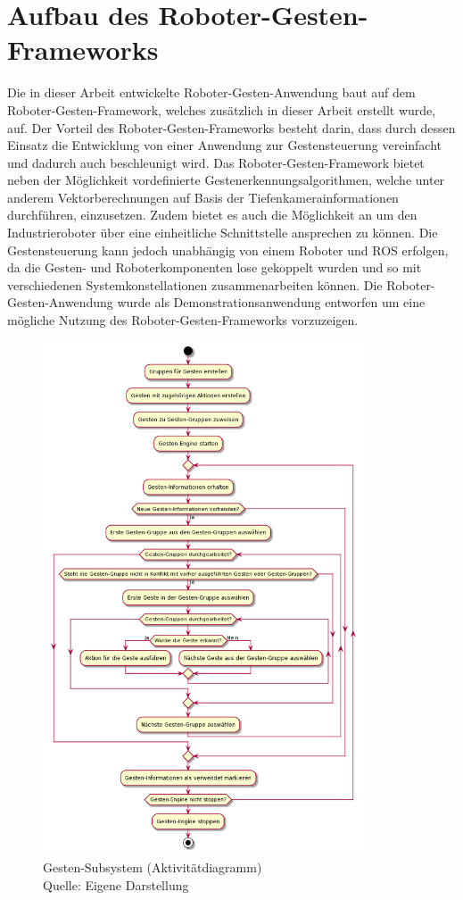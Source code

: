 \section{Aufbau des Roboter-Gesten-Frameworks}
Die in dieser Arbeit entwickelte Roboter-Gesten-Anwendung baut auf dem Roboter-Gesten-Framework, welches zusätzlich in dieser Arbeit erstellt wurde, auf. Der Vorteil des Roboter-Gesten-Frameworks besteht darin, dass durch dessen Einsatz die Entwicklung von einer Anwendung zur Gestensteuerung vereinfacht und dadurch auch beschleunigt wird. Das Roboter-Gesten-Framework bietet neben der Möglichkeit vordefinierte Gestenerkennungsalgorithmen, welche unter anderem Vektorberechnungen auf Basis der Tiefenkamerainformationen durchführen, einzusetzen. Zudem bietet es auch die Möglichkeit an um den Industrieroboter über eine einheitliche Schnittstelle ansprechen zu können. Die Gestensteuerung kann jedoch unabhängig von einem Roboter und ROS erfolgen, da die Gesten- und Roboterkomponenten lose gekoppelt wurden und so mit verschiedenen Systemkonstellationen zusammenarbeiten können. Die Roboter-Gesten-Anwendung wurde als Demonstrationsanwendung entworfen um eine mögliche Nutzung des Roboter-Gesten-Frameworks vorzuzeigen.

\begin{figure}[htb]
	\centering
	\includegraphics[width=0.85\textwidth]{images/loesungsweg/gesture_subsystem_uml}
	\caption[Gesten-Subsystem (Aktivitätdiagramm)]{Gesten-Subsystem (Aktivitätdiagramm)\\Quelle: Eigene Darstellung}
	\label{fig:gesture_subsystem_uml}
\end{figure}
\FloatBarrier

